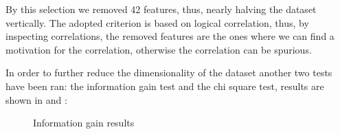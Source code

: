 

By this selection we removed 42 features, thus, nearly halving the dataset vertically. The adopted criterion is based on logical correlation, thus, by inspecting correlations, the removed features are the ones where we can find a motivation for the correlation, otherwise the correlation can be spurious.

In order to further reduce the dimensionality of the dataset another two tests have been ran: the information gain test and the chi square test, results are shown in  and :

\begin{figure}[H]
    \label{fig:ig}
    \caption{Information gain results}
\end{figure}

